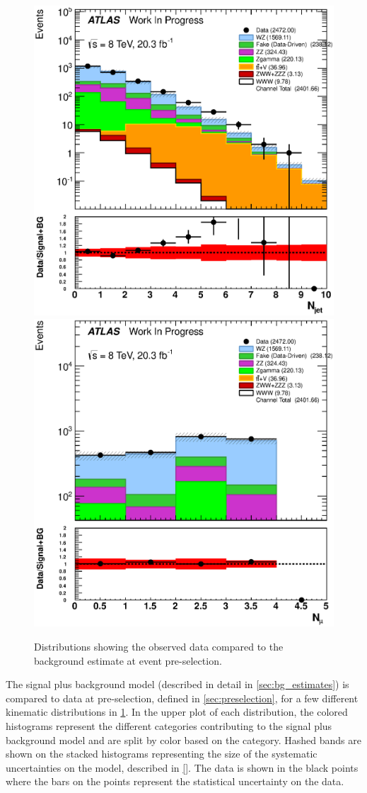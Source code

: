 \begin{figure}[ht!]
\includegraphics[width=0.3\columnwidth]{figures/appendix_signal_selection/Nov24Update_FakeSys_KFacSys_LogY_NoRebin/output/jobs/MxM/DataFull_Rates_May13_FakeRatesExactly2Loose_MuonMxMBJetGt0_ElBJetGt0SubtractPC_MxM/PreselectionNov23_15_physics/weight_all/eps/NJets_histratio.eps}
\includegraphics[width=0.3\columnwidth]{figures/appendix_signal_selection/Nov24Update_FakeSys_KFacSys_LogY_NoRebin/output/jobs/MxM/DataFull_Rates_May13_FakeRatesExactly2Loose_MuonMxMBJetGt0_ElBJetGt0SubtractPC_MxM/PreselectionNov23_15_physics/weight_all/eps/NMuons_histratio.eps}
\caption{Distributions showing the observed data compared to the background estimate at event pre-selection.}
\label{fig:preselection}
\end{figure}
The signal plus background model 
(described in detail in \sec\ref{sec:bg_estimates})
is compared to data at pre-selection, defined in \sec\ref{sec:preselection},
for a few different kinematic distributions 
in \fig\ref{fig:preselection}. In the upper plot of each distribution,
the colored histograms 
represent the different categories contributing to the signal 
plus background model and 
are split by color based on the category. 
Hashed bands are shown on the stacked
histograms representing the size of the systematic uncertainties 
on the model, described in \sec\ref{}.
The data is shown in the black points where the 
bars on the points represent the statistical uncertainty on the data.
